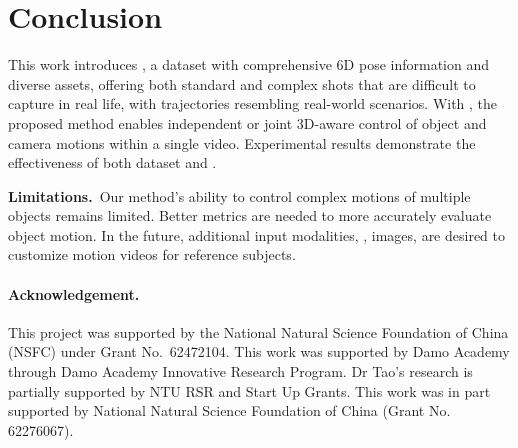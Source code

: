 \vspace{-0.8mm}
\section{Conclusion}
\label{sec:conclusion}
\vspace{-1mm}

This work introduces \datasetname, a dataset with comprehensive 6D pose information and diverse assets, offering both standard and complex shots that are difficult to capture in real life, with trajectories resembling real-world scenarios. With \datasetname, the proposed method \methodname enables independent or joint 3D-aware control of object and camera motions within a single video. Experimental results demonstrate the effectiveness of both \datasetname dataset and \methodname.

\noindent\textbf{Limitations.}~Our method's ability to control complex motions of multiple objects remains limited. Better metrics are needed to more accurately evaluate object motion. In the future, additional input modalities, \eg, images, are desired to customize motion videos for reference subjects.

\clearpage
\footnotesize{\paragraph{Acknowledgement.} This project was supported by the National Natural Science Foundation of China (NSFC) under Grant No.~62472104. This work was supported by Damo Academy through Damo Academy Innovative Research Program. Dr Tao's research is partially supported by NTU RSR and Start Up Grants. This work was in part supported by National Natural Science Foundation of China (Grant No. 62276067).}




